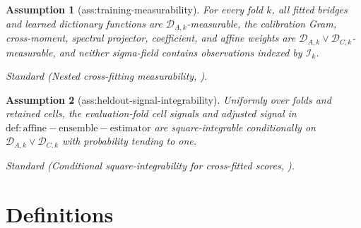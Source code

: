 \documentclass{article}
\newtheorem{assumption}{Assumption}
\begin{document}
\begin{assumption}[ass:training-measurability]\label{ass:training-measurability}
For every fold \(k\), all fitted bridges and learned dictionary functions are \(\mathcal D_{A,k}\)-measurable, the calibration Gram, cross-moment, spectral projector, coefficient, and affine weights are \(\mathcal D_{A,k}\vee\mathcal D_{C,k}\)-measurable, and neither sigma-field contains observations indexed by \(\mathcal I_k\).
\par\smallskip\noindent\emph{Standard} (Nested cross-fitting measurability, \cite{BennettEtAl2023SourceConditionDR}).
\end{assumption}

\begin{assumption}[ass:heldout-signal-integrability]\label{ass:heldout-signal-integrability}
Uniformly over folds and retained cells, the evaluation-fold cell signals and adjusted signal in \(\mathrm{def:affine-ensemble-estimator}\) are square-integrable conditionally on \(\mathcal D_{A,k}\vee\mathcal D_{C,k}\) with probability tending to one.
\par\smallskip\noindent\emph{Standard} (Conditional square-integrability for cross-fitted scores, \cite{BennettEtAl2023SourceConditionDR}).
\end{assumption}

\section{Definitions}
\end{document}
